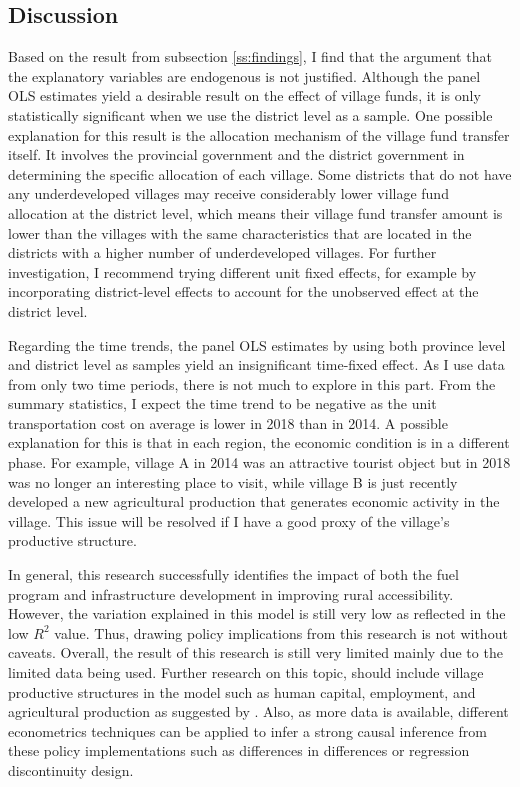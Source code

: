 \documentclass[letterpaper,12pt,leqno]{article}
\begin{document}
\subsection{Discussion}
Based on the result from subsection \ref{ss:findings}, I find that the argument that the explanatory variables are endogenous is not justified. Although the panel OLS estimates yield a desirable result on the effect of village funds, it is only statistically significant when we use the district level as a sample. One possible explanation for this result is the allocation mechanism of the village fund transfer itself. It involves the provincial government and the district government in determining the specific allocation of each village. Some districts that do not have any underdeveloped villages may receive considerably lower village fund allocation at the district level, which means their village fund transfer amount is lower than the villages with the same characteristics that are located in the districts with a higher number of underdeveloped villages. For further investigation, I recommend trying different unit fixed effects, for example by incorporating district-level effects to account for the unobserved effect at the district level.

Regarding the time trends, the panel OLS estimates by using both province level and district level as samples yield an insignificant time-fixed effect. As I use data from only two time periods, there is not much to explore in this part. From the summary statistics, I expect the time trend to be negative as the unit transportation cost on average is lower in 2018 than in 2014. A possible explanation for this is that in each region, the economic condition is in a different phase. For example, village A in 2014 was an attractive tourist object but in 2018 was no longer an interesting place to visit, while village B is just recently developed a new agricultural production that generates economic activity in the village. This issue will be resolved if I have a good proxy of the village's productive structure.

In general, this research successfully identifies the impact of both the fuel program and infrastructure development in improving rural accessibility. However, the variation explained in this model is still very low as reflected in the low $R^2$ value. Thus, drawing policy implications from this research is not without caveats. Overall, the result of this research is still very limited mainly due to the limited data being used. Further research on this topic, should include village productive structures in the model such as human capital, employment, and agricultural production as suggested by \citet{asher_2020}. Also, as more data is available, different econometrics techniques can be applied to infer a strong causal inference from these policy implementations such as differences in differences or regression discontinuity design.
\end{document}
